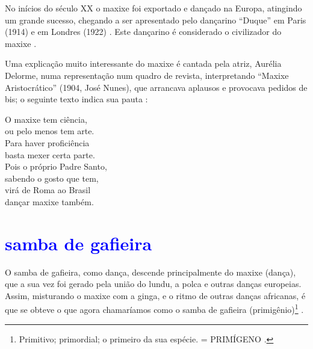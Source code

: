 No inícios do século XX o maxixe foi exportado e dançado na Europa, atingindo um grande sucesso, 
chegando a ser apresentado pelo dançarino ``Duque'' em Paris (1914) e em Londres (1922) \cite[pp. 465]{marcondes1977enciclopedia}.
Este dançarino é considerado o civilizador do maxixe \cite[pp. 129]{efege1974maxixe}.

Uma explicação muito interessante do maxixe é cantada pela atriz, Aurélia Delorme,
numa representação num quadro de revista, interpretando  ``Maxixe Aristocrático'' (1904, José Nunes), 
que arrancava aplausos e provocava pedidos de bis;
o seguinte texto indica sua pauta \cite[pp. 80-81]{efege1974maxixe} \cite{REIS2003}: 
\begin{citando}
O maxixe tem ciência,\\
ou pelo menos tem arte.\\
Para haver proficiência\\
basta mexer certa parte.\\
Pois o próprio Padre Santo,\\
sabendo o gosto que tem,\\
virá de Roma ao Brasil\\
dançar maxixe também.\\ 
\end{citando}



\section{\textcolor{blue}{samba de gafieira}}
O samba de gafieira, como dança, descende principalmente do maxixe (dança),
que a sua vez foi gerado  pela união do  lundu, 
a polca e outras danças europeias.
Assim, misturando o maxixe com a ginga, e o ritmo de outras danças africanas, 
é que se obteve o que agora chamaríamos como o samba de gafieira (primigênio)\footnote{
Primitivo; primordial; o primeiro da sua espécie. = PRIMÍGENO \cite{priberamprimigenio}.
} \cite[pp. 139]{perna2002samba}.




